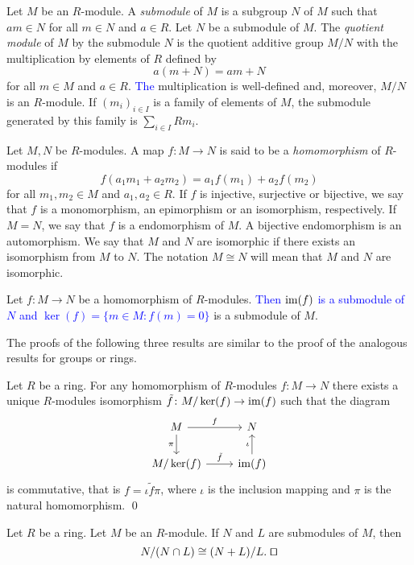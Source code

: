 Let $M$ be an $R$-module. A {\em submodule} of $M$ is a subgroup $N$ of $M$
such that $am\in N$ for all $m\in N$ and $a\in R$. Let $N$ be a submodule of $M$. 
The {\em quotient module} 
of $M$ by the submodule $N$ is
the quotient additive group $M/N$ with the multiplication by elements of $R$ defined by
\[
a(m+N)=am+N
\]
for all $m\in M$ and $a\in R$.
\textcolor{blue}{The} multiplication is well-defined and, moreover, 
$M/N$ is an $R$-module. If $(m_i)_{i\in I}$ is a family of elements of $M$, the submodule generated by this family is 
$\sum_{i \in I}Rm_i$.

Let $M,N$ be $R$-modules. A map $f\colon M\rightarrow
N$ is said to be a {\em homomorphism} of $R$-modules if
\[
f(a_1m_1+a_2m_2)=a_1f(m_1)+a_2f(m_2)
\]
for all $m_1,m_2\in M$ and $a_1,a_2\in R$.
If $f$ is injective, surjective or bijective, we say that $f$ is
a monomorphism, an epimorphism or an isomorphism, respectively. If $M=N$, we say that
$f$ is a endomorphism of $M$. A bijective endomorphism is an
automorphism. We say that $M$ and $N$ are isomorphic if there exists 
an isomorphism from $M$ to $N$. The notation
$M\cong N$ will mean that $M$ and $N$ are isomorphic.

Let $f\colon M\rightarrow N$ be a homomorphism of $R$-modules. \textcolor{blue}{Then
$\operatorname{im}(f)$ is a submodule
of $N$ and $\ker(f)=\{m\in M:f(m)=0\}$} is a submodule of $M$.

The proofs of the following three results are similar to the proof of the analogous results for groups or rings. 
 
\begin{theorem}
Let $R$ be a ring.	For any homomorphism of $R$-modules $f\colon M\rightarrow N$ there exists a unique $R$-modules isomorphism $\tilde f\colon M/\ker(f)\rightarrow\operatorname{im}(f)$ such that the diagram
	\[\begin{tikzcd}
		{M} & {N} \\
		{M/\ker(f)} & {\im(f)}
		\arrow["f", from=1-1, to=1-2]
		\arrow["{\pi}"', from=1-1, to=2-1]
		\arrow["{\iota}", from=2-2, to=1-2]
		\arrow["{\tilde f}", from=2-1, to=2-2]
	\end{tikzcd}
	\]
	is commutative, that is $f=\iota\tilde f\pi$, where $\iota$ is the inclusion mapping and $\pi$ is the natural homomorphism. \qed	
\end{theorem} 


\begin{theorem}
Let $R$ be a ring.	Let $M$ be an $R$-module. If $N$ and $L$ are submodules of $M$, then 
	$$N/(N\cap L)\cong (N+L)/L. \; \qed$$  
\end{theorem}

